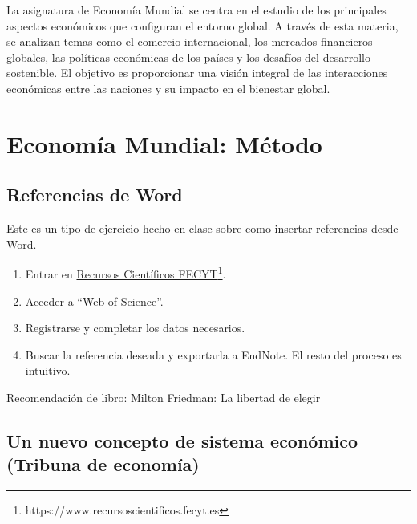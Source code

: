 \documentclass[12pt]{report} %
\begin{document}
La asignatura de Economía Mundial se centra en el estudio de los
principales aspectos económicos que configuran el entorno global. A
través de esta materia, se analizan temas como el comercio
internacional, los mercados financieros globales, las políticas
económicas de los países y los desafíos del desarrollo sostenible. El
objetivo es proporcionar una visión integral de las interacciones
económicas entre las naciones y su impacto en el bienestar global.

\hypertarget{economuxeda-mundial-muxe9todo}{%
\chapter{Economía Mundial: Método}\label{economuxeda-mundial-muxe9todo}}

\hypertarget{referencias-de-word}{%
\section{Referencias de Word}\label{referencias-de-word}}

\begin{ejercicio}

Este es un tipo de ejercicio hecho en clase sobre como insertar referencias desde Word.

\begin{enumerate}
   \item Entrar en \href{https://www.recursoscientificos.fecyt.es}{Recursos Científicos FECYT}\footnote{https://www.recursoscientificos.fecyt.es}.
   \item Acceder a “Web of Science”.
   \item Registrarse y completar los datos necesarios.
   \item Buscar la referencia deseada y exportarla a EndNote. El resto del proceso es intuitivo.
\end{enumerate}

Recomendación de libro: Milton Friedman: La libertad de elegir

\end{ejercicio}

\hypertarget{un-nuevo-concepto-de-sistema-econuxf3mico-tribuna-de-economuxeda}{%
\section{Un nuevo concepto de sistema económico (Tribuna de
economía)}\label{un-nuevo-concepto-de-sistema-econuxf3mico-tribuna-de-economuxeda}}
\end{document}

